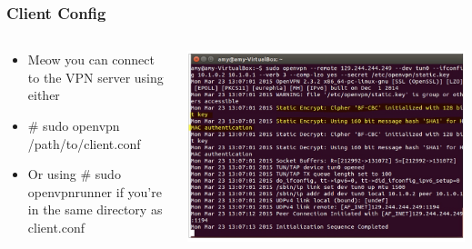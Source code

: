 \documentclass{beamer}
\begin{document}
\begin{frame}
\frametitle{Client Config}
\begin{columns}
    \begin{column}{0.48\textwidth}
        \begin{itemize}
	\item Meow you can connect to the VPN server using either 
	\item \# sudo openvpn /path/to/client.conf 
	\item Or using \# sudo openvpnrunner if you're in the same directory as client.conf
        \end{itemize}
    \end{column}
    \begin{column}{.5\textwidth}
        \includegraphics[width=.9\linewidth]{am2}
    \end{column}
\end{columns}
\end{frame}
\end{document}
